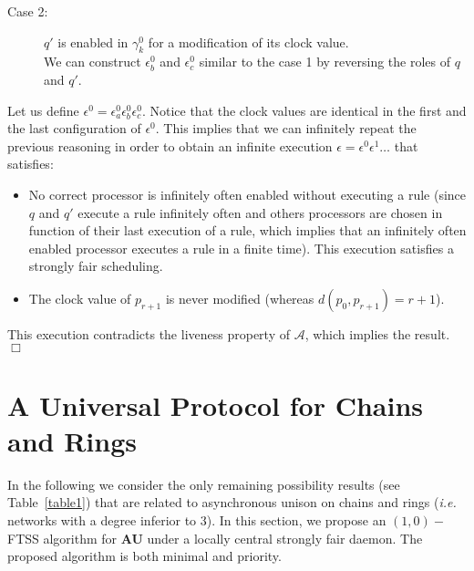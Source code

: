 \documentclass[11pt,english,letterpaper]{article}
\newenvironment{proof}{{\noindent\bf Proof. } }{{\hfill $\Box$}}
\begin{document}
\begin{proof}
\begin{description}
\item[Case 2:] $q'$ is enabled in $\gamma_{k}^{0}$ for a modification of its clock value.\\
We can construct $\epsilon_{b}^{0}$ and $\epsilon_{c}^{0}$ similar to the case 1 by reversing the roles of $q$ and $q'$.
\end{description}

Let us define $\epsilon^{0}=\epsilon_{a}^{0}\epsilon_{b}^{0}\epsilon_{c}^{0}$. Notice that the clock values are identical in the first and the last configuration of $\epsilon^{0}$. This implies that we can infinitely repeat the previous reasoning in order to obtain an infinite execution $\epsilon=\epsilon^{0}\epsilon^{1}\ldots$ that satisfies:

\begin{itemize}
\item No correct processor is infinitely often enabled without executing a rule (since $q$ and $q'$ execute a rule infinitely often and others processors are chosen in function of their last execution of a rule, which implies that an infinitely often enabled processor executes a rule in a finite time). This execution satisfies a strongly fair scheduling.
\item The clock value of $p_{r+1}$ is never modified (whereas $d(p_{0},p_{r+1})=r+1$).
\end{itemize}

This execution contradicts the liveness property of $\mathcal{A}$, which implies the result.
\end{proof}

\section{A Universal Protocol for Chains and Rings}\label{sec:positive} 

In the following we consider the only remaining possibility results (see Table~\ref{table1}) that are related to asynchronous unison on chains and rings (\emph{i.e.} networks with a degree inferior to 3). In this section, we propose an $(1,0)-$FTSS algorithm for \textbf{AU} under a locally central strongly fair daemon. The proposed algorithm is both minimal and priority.
\end{document}
